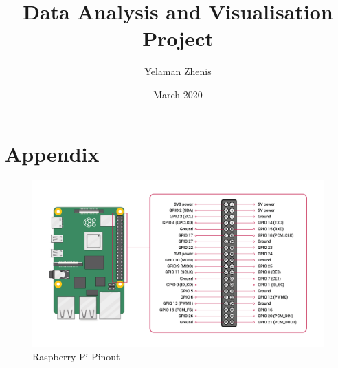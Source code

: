 \documentclass{article}
\title{\vspace{-3em}Data Analysis and Visualisation Project}
\author{Yelaman Zhenis }
\date{March 2020}
\begin{document}
\maketitle




\newpage
\section{Appendix}
\begin{figure}[h!]
\centering
\includegraphics[width=\textwidth]{pinout.png}
\caption{Raspberry Pi Pinout}
\label{fig:pinout}
\end{figure}\newpage


\end{document}
